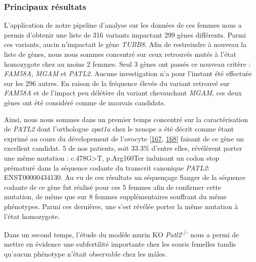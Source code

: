 \documentclass[12pt,twoside]{reedthesis}
\theoremstyle{definition}
\theoremstyle{definition}
\theoremstyle{remark}
\begin{document}
  \newpage
  
  
  
  \newpage
  
  \subsubsection{Principaux résultats}\label{principaux-resultats-3}
  
  L'application de notre pipeline d'analyse sur les données de ces femmes
  nous a permis d'obtenir une liste de 316 variants impactant 299 gènes
  différents. Parmi ces variants, aucin n'impactait le gène \emph{TUBB8}.
  Afin de restreindre à nouveau la liste de gènes, nous nous sommes
  concentré sur ceux retrouvés mutés à l'état homozygote chez au moins 2
  femmes. Seul 3 gènes ont passés ce nouveau critère : \emph{FAM58A},
  \emph{MGAM} et \emph{PATL2}. Aucune investigation n'a pour l'instant été
  effectuée sur les 296 autres. En raison de la fréquence élevée du
  variant retrouvé sur \emph{FAM58A} et de l'impact peu délétère du
  variant chevauchant \emph{MGAM}, ces deux gènes ont été considéré comme
  de mauvais candidats.
  
  Ainsi, nous nous sommes dans un premier temps concentré sur la
  caractérisation de \emph{PATL2} dont l'orthologue \emph{xpat1a} chez le
  xenope a été décrit comme étant exprimé au cours du dévelopement de
  l'ovocyte {[}\protect\hyperlink{ref-Marnef2010}{167},
  \protect\hyperlink{ref-Nakamura2010}{168}{]} faisant de ce gène un
  excellent candidat. 5 de nos patients, soit 33.3\% d'entre elles,
  révélèrent porter une même mutation : c.478G\textgreater{}T, p.Arg160Ter
  induisant un codon stop prématuré dans la séquence codante du transcrit
  canonique \emph{PATL2}: ENST00000434130. Au vu de ces résultats un
  séquençage Sanger de la séquence codante de ce gène fut réalisé pour ces
  5 femmes afin de confirmer cette mutation, de même que sur 8 femmes
  supplémentaires souffrant du même phénotypes. Parmi ces dernières, une
  s'est révélée porter la même mutation à l'état homozygote.
  
  Dans un second temps, l'étude du modèle murin KO
  \emph{Patl2}\textsuperscript{-/-} nous a permi de mettre en évidence une
  subfertilité importante chez les souris femelles tandis qu'aucun
  phénotype n'était observable chez les mâles.
  
\end{document}
